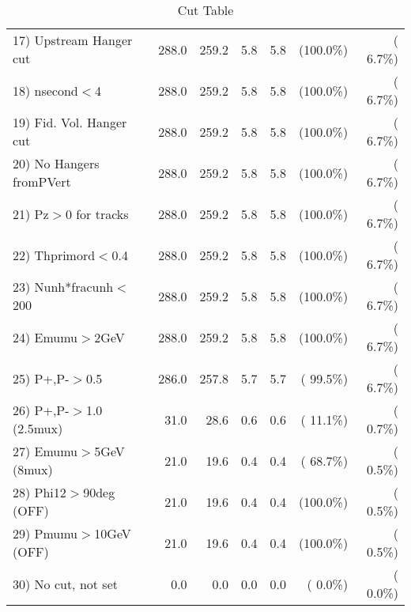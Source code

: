 \begin{table}[h!]
\begin{tabular}{||l||r|r|r|r|r|r||}
 17) Upstream Hanger cut  &        288.0 &        259.2 &          5.8 &          5.8 & (100.0\%) & (  6.7\%) \\
 18) nsecond$<$4          &        288.0 &        259.2 &          5.8 &          5.8 & (100.0\%) & (  6.7\%) \\
 19) Fid. Vol. Hanger cut &        288.0 &        259.2 &          5.8 &          5.8 & (100.0\%) & (  6.7\%) \\
 20) No Hangers fromPVert &        288.0 &        259.2 &          5.8 &          5.8 & (100.0\%) & (  6.7\%) \\
 21) Pz$>$0 for tracks    &        288.0 &        259.2 &          5.8 &          5.8 & (100.0\%) & (  6.7\%) \\
 22) Thprimord$<$0.4      &        288.0 &        259.2 &          5.8 &          5.8 & (100.0\%) & (  6.7\%) \\
 23) Nunh*fracunh$<$200   &        288.0 &        259.2 &          5.8 &          5.8 & (100.0\%) & (  6.7\%) \\
 24) Emumu$>$2GeV         &        288.0 &        259.2 &          5.8 &          5.8 & (100.0\%) & (  6.7\%) \\
 25) P+,P-$>$0.5          &        286.0 &        257.8 &          5.7 &          5.7 & ( 99.5\%) & (  6.7\%) \\
 26) P+,P-$>$1.0 (2.5mux) &         31.0 &         28.6 &          0.6 &          0.6 & ( 11.1\%) & (  0.7\%) \\
 27) Emumu$>$5GeV  (8mux) &         21.0 &         19.6 &          0.4 &          0.4 & ( 68.7\%) & (  0.5\%) \\
 28) Phi12$>$90deg  (OFF) &         21.0 &         19.6 &          0.4 &          0.4 & (100.0\%) & (  0.5\%) \\
 29) Pmumu$>$10GeV  (OFF) &         21.0 &         19.6 &          0.4 &          0.4 & (100.0\%) & (  0.5\%) \\
 30) No cut, not set      &          0.0 &          0.0 &          0.0 &          0.0 & (  0.0\%) & (  0.0\%) \\
 \hline
 \hline
 \end{tabular}
 \caption{Cut Table           }
 \label{tab-cutheavy_neutrino_0.350}
 \end{table}
